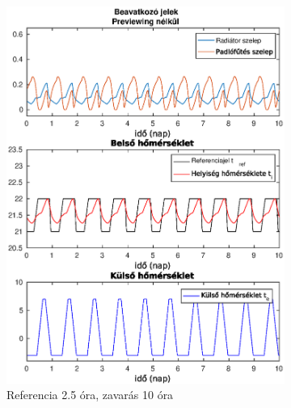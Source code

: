 \documentclass[14pt,handout]{beamer}
\begin{document}
\begin{frame}
\begin{figure}[H]
	\begin{subfigure}[t]{0.49\textwidth}
		\centering
		\includegraphics[trim=0 0 0 27, clip,width=\textwidth]{figures/onlab/compare/A_C_P5D10}
		\caption{\scriptsize Referencia 2.5 óra, zavarás 10 óra}
		\label{fig:mpc-pr5d10-2}
	\end{subfigure}
	~
	\begin{subfigure}[t]{0.45\textwidth}
		\centering

\end{subfigure}
\end{figure}
\end{frame}
\end{document}

